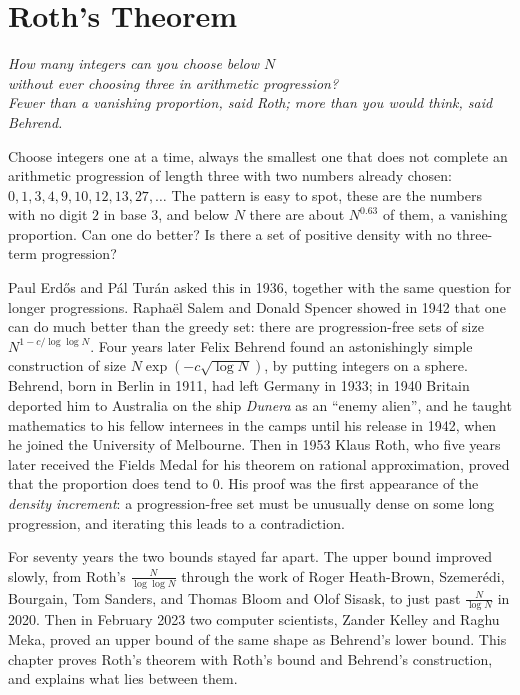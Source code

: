 \chapter{Roth's Theorem}
\begin{center}\itshape
How many integers can you choose below $N$\\
without ever choosing three in arithmetic progression?\\
Fewer than a vanishing proportion, said Roth; more than you would think, said Behrend.
\end{center}

Choose integers one at a time, always the smallest one that does not complete an arithmetic progression of length three with two numbers already chosen: $0,1,3,4,9,10,12,13,27,\dots$ The pattern is easy to spot, these are the numbers with no digit $2$ in base $3$, and below $N$ there are about $N^{0.63}$ of them, a vanishing proportion. Can one do better? Is there a set of positive density with no three-term progression?

Paul Erdős and Pál Turán asked this in 1936, together with the same question for longer progressions. Raphaël Salem and Donald Spencer showed in 1942 that one can do much better than the greedy set: there are progression-free sets of size $N^{1-c/\log\log N}$. Four years later Felix Behrend found an astonishingly simple construction of size $N\exp(-c\sqrt{\log N})$, by putting integers on a sphere. Behrend, born in Berlin in 1911, had left Germany in 1933; in 1940 Britain deported him to Australia on the ship \emph{Dunera} as an ``enemy alien'', and he taught mathematics to his fellow internees in the camps until his release in 1942, when he joined the University of Melbourne. Then in 1953 Klaus Roth, who five years later received the Fields Medal for his theorem on rational approximation, proved that the proportion does tend to $0$. His proof was the first appearance of the \emph{density increment}: a progression-free set must be unusually dense on some long progression, and iterating this leads to a contradiction.

For seventy years the two bounds stayed far apart. The upper bound improved slowly, from Roth's $\frac N{\log\log N}$ through the work of Roger Heath-Brown, Szemerédi, Bourgain, Tom Sanders, and Thomas Bloom and Olof Sisask, to just past $\frac N{\log N}$ in 2020. Then in February 2023 two computer scientists, Zander Kelley and Raghu Meka, proved an upper bound of the same shape as Behrend's lower bound. This chapter proves Roth's theorem with Roth's bound and Behrend's construction, and explains what lies between them.

